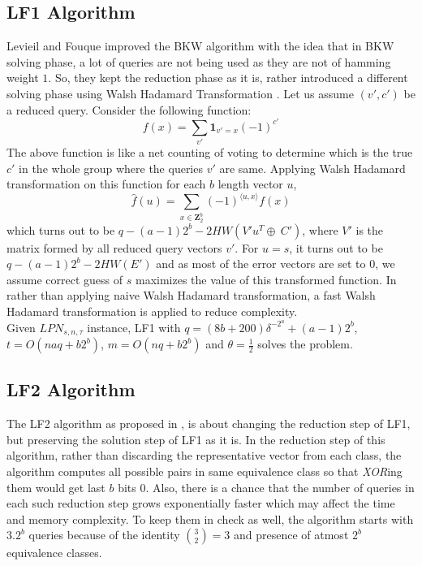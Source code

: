 \documentclass{article}
\begin{document}
      \subsection[2.2]{LF1 Algorithm}
      Levieil and Fouque improved the BKW algorithm with the idea that in BKW solving phase, a lot of queries are not being used as they are not of hamming weight $1$. So, they kept the reduction phase as it is, rather introduced a different solving phase using Walsh Hadamard Transformation \cite{LF}. Let us assume $(v',c')$ be a reduced query. Consider the following function:
       $$f(x)=\sum_{v'}\mathbf{1}_{v'=x}(-1)^{c'}$$
        The above function is like a net counting of voting to determine which is the true $c'$  in the whole group where the queries $v'$ are same. Applying Walsh Hadamard transformation on this function for each $b$ length vector $u$, $$\hat{f}(u)=\sum_{x\in\mathbf{Z}_2^{b}}(-1)^{\langle u,x\rangle}f(x)$$ which turns out to be $q-(a-1)2^b- 2HW(V'u^T\oplus\ C')$, where $V'$ is the matrix formed by all reduced query vectors $v'$. For $u=s$, it turns out to be $q-(a-1)2^b-2HW(E')$ and as most of the error vectors are set to $0$, we assume correct guess of $s$ maximizes the value of this transformed function. In \cite{LF} rather than applying naive Walsh Hadamard transformation, a fast Walsh Hadamard transformation is applied to reduce complexity.\\
        
        Given $LPN_{s,n,\tau}$ instance, LF1 with $q=(8b+200)\delta^{-2^a}+(a-1)2^b$, $t= O(naq+b2^b)$, $m=O(nq+b2^b)$ and $\theta=\frac{1}{2}$ solves the problem.
        
    \subsection[2.3]{LF2 Algorithm}
    The LF2 algorithm as proposed in \cite{LF}, is about changing the reduction step of LF1, but preserving the solution step of LF1 as it is. In the reduction step of this algorithm, rather than discarding the representative vector from each class, the algorithm computes all possible pairs in same equivalence class so that \emph{XOR}ing them would get last $b$ bits $0$. Also, there is a chance that the number of queries in each such reduction step grows exponentially faster which may affect the time and memory complexity. To keep them in check as well, the algorithm starts with $3.2^b$ queries because of the identity $\binom{3}{2}=3$ and presence of atmost $2^b$ equivalence classes.\\
    
\end{document}
